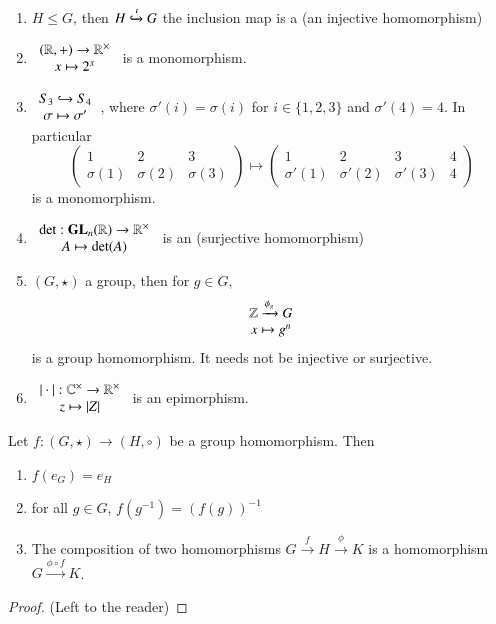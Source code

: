 \documentclass[12pt, a4paper, oneside, openright, titlepage]{book}
\begin{document}
\begin{eg}
    \leavevmode
    \begin{enumerate}
        \item $H \leq G$, then $H \xhookrightarrow{\iota} G$ the inclusion map is a  (an injective homomorphism)
        \item $\begin{array}{c} (\mathbb R,+)\rightarrow \mathbb R^{\times} \\ x\mapsto 2^x \end{array}$ is a monomorphism.
        \item $\begin{array}{c} S_3 \hookrightarrow S_4 \\ \sigma \mapsto \sigma' \end{array}$, where $\sigma'(i) = \sigma(i)$ for $i \in \{1,2,3\}$ and $\sigma'(4) = 4$. In particular $$\begin{pmatrix} 1 & 2 & 3 \\ \sigma(1) & \sigma(2) & \sigma(3)  \end{pmatrix}\mapsto \begin{pmatrix} 1 & 2 & 3 & 4 \\ \sigma'(1) & \sigma'(2) & \sigma'(3) & 4  \end{pmatrix}$$
        is a monomorphism.
        \item $\begin{array}{c} \det:\mathbf{GL}_n(\mathbb R) \rightarrow \mathbb R^{\times} \\ A \mapsto \det(A) \end{array}$ is an  (surjective homomorphism)
        \item $(G,\star)$ a group, then for $g \in G$, $$\begin{array}{c} \mathbb Z\xrightarrow{\phi_g}G \\ x\mapsto g^n \end{array}$$ is a group homomorphism. It needs not be injective or surjective.
        \item $\begin{array}{c} |\cdot|:\mathbb C^{\times}\rightarrow \mathbb R^{\times} \\ z\mapsto |Z| \end{array}$ is an epimorphism.
    \end{enumerate}
\end{eg}


\begin{props}
    Let $f:(G,\star)\rightarrow (H,\circ)$ be a group homomorphism. Then \begin{enumerate}
        \item $f(e_G) = e_H$
        \item for all $g \in G$, $f(g^{-1}) = (f(g))^{-1}$
        \item The composition of two homomorphisms $G \xrightarrow{f} H \xrightarrow{\phi}K$ is a homomorphism $G\xrightarrow{\phi \circ f}K$.
    \end{enumerate}
\end{props}
\begin{proof}
    (Left to the reader)
\end{proof}
\end{document}

